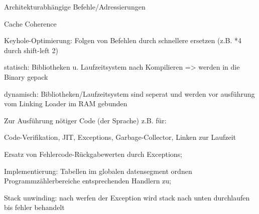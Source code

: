 Architekturabhängige Befehle/Adressierungen

Cache Coherence

Keyhole-Optimierung: Folgen von Befehlen durch schnellere ersetzen (z.B. *4 durch shift-left 2)

statisch: Bibliotheken u. Laufzeitsystem nach Kompilieren => werden in die Binary gepack

dynamisch: Bibliotheken/Laufzeitsystem sind seperat und werden vor ausführung vom Linking Loader im RAM gebunden


Zur Ausführung nötiger Code (der Sprache) z.B. für:

Code-Verifikation, JIT, Exceptions, Garbage-Collector, Linken zur Laufzeit

Ersatz von Fehlercode-Rückgabewerten durch Exceptions;

Implementierung: Tabellen im globalen datensegment ordnen Programmzählerbereiche entsprechenden Handlern zu; 

Stack unwinding: nach werfen der Exception wird stack nach unten durchlaufen bis fehler behandelt